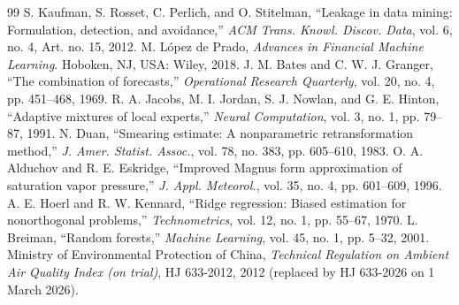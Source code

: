 \documentclass[conference]{IEEEtran}
\begin{document}
\begin{thebibliography}{99}
 S. Kaufman, S. Rosset, C. Perlich, and O. Stitelman, ``Leakage in data mining: Formulation, detection, and avoidance,'' \emph{ACM Trans. Knowl. Discov. Data}, vol. 6, no. 4, Art. no. 15, 2012.
 M. L\'{o}pez de Prado, \emph{Advances in Financial Machine Learning}. Hoboken, NJ, USA: Wiley, 2018.
 J. M. Bates and C. W. J. Granger, ``The combination of forecasts,'' \emph{Operational Research Quarterly}, vol. 20, no. 4, pp. 451--468, 1969.
 R. A. Jacobs, M. I. Jordan, S. J. Nowlan, and G. E. Hinton, ``Adaptive mixtures of local experts,'' \emph{Neural Computation}, vol. 3, no. 1, pp. 79--87, 1991.
 N. Duan, ``Smearing estimate: A nonparametric retransformation method,'' \emph{J. Amer. Statist. Assoc.}, vol. 78, no. 383, pp. 605--610, 1983.
 O. A. Alduchov and R. E. Eskridge, ``Improved Magnus form approximation of saturation vapor pressure,'' \emph{J. Appl. Meteorol.}, vol. 35, no. 4, pp. 601--609, 1996.
 A. E. Hoerl and R. W. Kennard, ``Ridge regression: Biased estimation for nonorthogonal problems,'' \emph{Technometrics}, vol. 12, no. 1, pp. 55--67, 1970.
 L. Breiman, ``Random forests,'' \emph{Machine Learning}, vol. 45, no. 1, pp. 5--32, 2001.
 Ministry of Environmental Protection of China, \emph{Technical Regulation on Ambient Air Quality Index (on trial)}, HJ 633-2012, 2012 (replaced by HJ 633-2026 on 1 March 2026).
\end{thebibliography}
\end{document}
